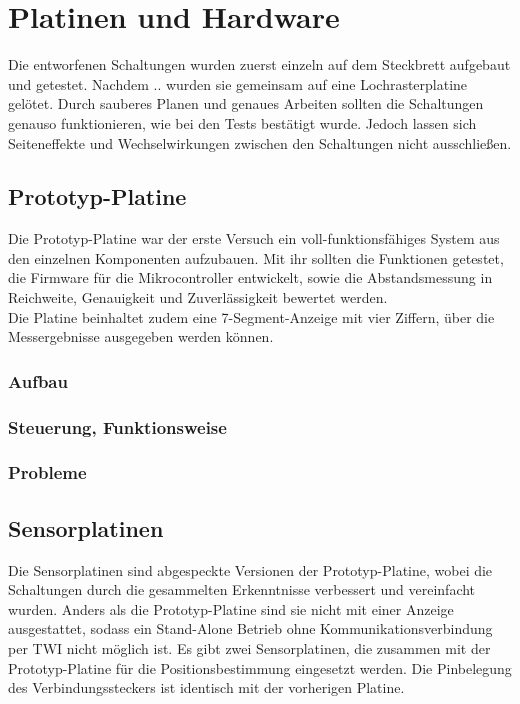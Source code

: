 
\chapter{Platinen und Hardware}
Die entworfenen Schaltungen wurden zuerst einzeln auf dem Steckbrett aufgebaut und getestet. Nachdem .. wurden sie gemeinsam auf eine Lochrasterplatine gelötet. Durch sauberes Planen und genaues Arbeiten sollten die Schaltungen genauso funktionieren, wie bei den Tests bestätigt wurde. Jedoch lassen sich Seiteneffekte und Wechselwirkungen zwischen den Schaltungen nicht ausschließen.


\section{Prototyp-Platine}
Die Prototyp-Platine war der erste Versuch ein voll-funktionsfähiges System aus den einzelnen Komponenten aufzubauen. Mit ihr sollten die Funktionen getestet, die Firmware für die Mikrocontroller entwickelt, sowie die Abstandsmessung in Reichweite, Genauigkeit und Zuverlässigkeit bewertet werden.\\
Die Platine beinhaltet zudem eine 7-Segment-Anzeige mit vier Ziffern, über die Messergebnisse ausgegeben werden können.


\subsection{Aufbau}


\subsection{Steuerung, Funktionsweise}


\subsection{Probleme}



\section{Sensorplatinen}
Die Sensorplatinen sind abgespeckte Versionen der Prototyp-Platine, wobei die Schaltungen durch die gesammelten Erkenntnisse verbessert und vereinfacht wurden. Anders als die Prototyp-Platine sind sie nicht mit einer Anzeige ausgestattet, sodass ein Stand-Alone Betrieb ohne Kommunikationsverbindung per \ac{TWI} nicht möglich ist. Es gibt zwei Sensorplatinen, die zusammen mit der Prototyp-Platine für die Positionsbestimmung eingesetzt werden. Die Pinbelegung des Verbindungssteckers ist identisch mit der vorherigen Platine.

